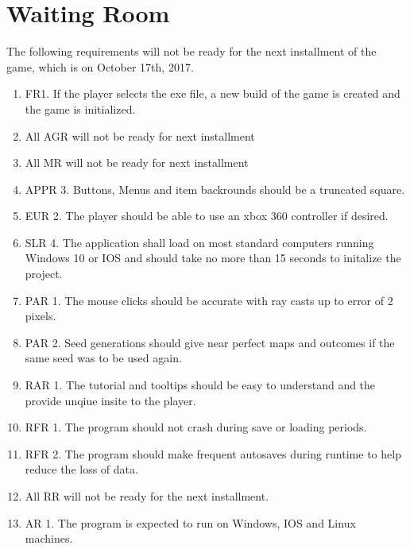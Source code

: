 \documentclass{article}
\begin{document}
\section{Waiting Room}
\quad The following requirements will not be ready for the next installment of the game, which is on October 17th, 2017.
\begin{enumerate}
	\item FR1. If the player selects the exe file, a new build of the game is created and the game is initialized.
	\item All AGR will not be ready for next installment
	\item All MR will not be ready for next installment
	\item APPR 3. Buttons, Menus and item backrounds should be a truncated square. 
	\item EUR 2. The player should be able to use an xbox 360 controller if desired.
	\item SLR 4. The application shall load on most standard computers running Windows 10 or IOS and should take no more than 15 seconds to initalize the project.
	\item PAR 1. The mouse clicks should be accurate with ray casts up to error of 2 pixels.
	\item PAR 2. Seed generations should give near perfect maps and outcomes if the same seed was to be used again.
	\item RAR 1. The tutorial and tooltips should be easy to understand and the provide unqiue insite to the player.
	\item RFR 1. The program should not crash during save or loading periods.
	\item RFR 2. The program should make frequent autosaves during runtime to help reduce the loss of data.
	\item All RR will not be ready for the next installment.
	\item AR 1. The program is expected to run on Windows, IOS and Linux machines.
\end{enumerate}
\end{document}

